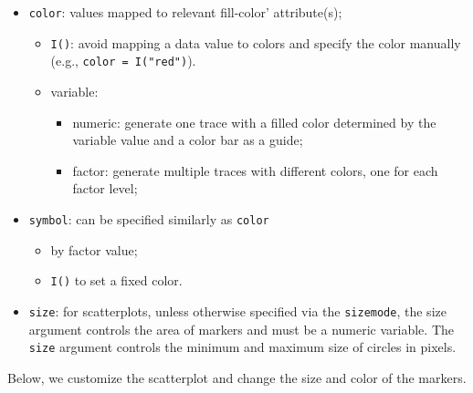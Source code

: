 \documentclass[]{book}
\providecommand{\tightlist}{%
  \setlength{\itemsep}{0pt}\setlength{\parskip}{0pt}}
\begin{document}
\begin{itemize}
\item
  \texttt{color}: values mapped to relevant fill-color' attribute(s);

  \begin{itemize}
  \tightlist
  \item
    \texttt{I()}: avoid mapping a data value to colors and specify the
    color manually (e.g., \texttt{color\ =\ I("red")}).
  \item
    variable:

    \begin{itemize}
    \tightlist
    \item
      numeric: generate one trace with a filled color determined by the
      variable value and a color bar as a guide;
    \item
      factor: generate multiple traces with different colors, one for
      each factor level;
    \end{itemize}
  \end{itemize}
\item
  \texttt{symbol}: can be specified similarly as \texttt{color}

  \begin{itemize}
  \tightlist
  \item
    by factor value;
  \item
    \texttt{I()} to set a fixed color.
  \end{itemize}
\item
  \texttt{size}: for scatterplots, unless otherwise specified via the
  \texttt{sizemode}, the size argument controls the area of markers and
  must be a numeric variable. The \texttt{size} argument controls the
  minimum and maximum size of circles in pixels.
\end{itemize}

Below, we customize the scatterplot and change the size and color of the
markers.
\end{document}
